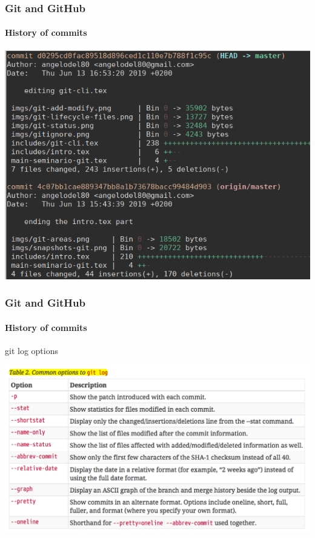 \begin{frame}
	\frametitle{Git and GitHub}
    \framesubtitle{History of commits}
    \addtocounter{nframe}{1}

	
		\begin{center}
			\includegraphics[width=.8\textwidth]{imgs/git-log-stats.png}
		\end{center}
	
\end{frame}

\begin{frame}
	\frametitle{Git and GitHub}
    \framesubtitle{History of commits}
    \addtocounter{nframe}{1}

	\begin{block}{git log options}
		\begin{center}
			\includegraphics[width=.95\textwidth]{imgs/git-log-options.png}
		\end{center}
	\end{block}

\end{frame}

